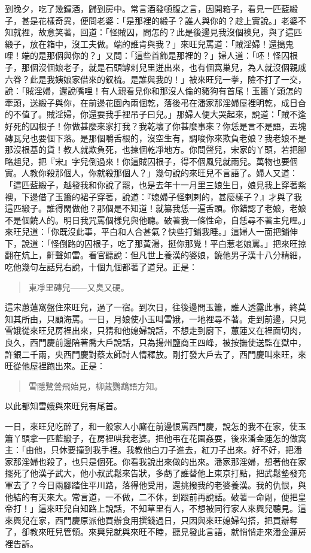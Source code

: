 到晚夕，吃了幾鐘酒，歸到房中。常言酒發頓腹之言，因開箱子，看見一匹藍緞子，甚是花樣奇異，便問老婆：「是那裡的緞子？誰人與你的？趁上實說。」老婆不知就裡，故意笑著，回道：「怪賊囚，問怎的？此是後邊見我沒個襖兒，與了這匹緞子，放在箱中，沒工夫做。端的誰肯與我？」來旺兒罵道：「賊淫婦！還搗鬼哩！端的是那個與你的？」又問：「這些首飾是那裡的？」婦人道：「呸！怪囚根子，那個沒個娘老子，就是石頭罅剌兒里迸出來，也有個窩巢兒，為人就沒個親戚六眷？此是我姨娘家借來的釵梳。是誰與我的！」被來旺兒一拳，險不打了一交，說：「賊淫婦，還說嘴哩！有人親看見你和那沒人倫的豬狗有首尾！玉簫丫頭怎的牽頭，送緞子與你，在前邊花園內兩個乾，落後弔在潘家那淫婦屋裡明乾，成日㒲的不值了。賊淫婦，你還要我手裡吊子曰兒。」那婦人便大哭起來，說道：「賊不逢好死的囚根子！你做甚麼來家打我？我乾壞了你甚麼事來？你恁是言不是語，丟塊磚瓦兒也要個下落。是那個嚼舌根的，沒空生有，調唆你來欺負老娘？我老娘不是那沒根基的貨！教人就欺負死，也揀個乾凈地方。你問聲兒，宋家的丫頭，若把腳略趄兒，把『宋』字兒倒過來！你這賊囚根子，得不個風兒就雨兒。萬物也要個實。人教你殺那個人，你就殺那個人？」幾句說的來旺兒不言語了。婦人又道：「這匹藍緞子，越發我和你說了罷，也是去年十一月里三娘生日，娘見我上穿著紫襖，下邊借了玉簫的裙子穿著，說道：『媳婦子怪剌剌的，甚麼樣子？』才與了我這匹緞子。誰得閑做他？那個是不知道！就纂我恁一遍舌頭。你錯認了老娘，老娘不是個饒人的。明日我咒罵個樣兒與他聽。破著我一條性命，自恁尋不著主兒哩。」來旺兒道：「你既沒此事，平白和人合甚氣？快些打鋪我睡。」這婦人一面把鋪伸下，說道：「怪倒路的囚根子，吃了那黃湯，挺你那覺！平白惹老娘罵。」把來旺掠翻在炕上，鼾聲如雷。看官聽說：但凡世上養漢的婆娘，饒他男子漢十八分精細，吃他幾句左話兒右說，十個九個都著了道兒。正是：
\begin{quote}
東凈里磚兒——又臭又硬。
\end{quote}

這宋蕙蓮窩盤住來旺兒，過了一宿。到次日，往後邊問玉簫，誰人透露此事，終莫知其所由，只顧海罵。一日，月娘使小玉叫雪娥，一地裡尋不著。走到前邊，只見雪娥從來旺兒房裡出來，只猜和他媳婦說話，不想走到廚下，蕙蓮又在裡面切肉，良久，西門慶前邊陪著喬大戶說話，只為揚州鹽商王四峰，被按撫使送監在獄中，許銀二千兩，央西門慶對蔡太師討人情釋放。剛打發大戶去了，西門慶叫來旺，來旺從他屋裡跑出來。正是：
\begin{quote}
雪隱鷺鶯飛始見，柳藏鸚鵡語方知。
\end{quote}

以此都知雪娥與來旺兒有尾首。

一日，來旺兒吃醉了，和一般家人小廝在前邊恨罵西門慶，說怎的我不在家，使玉簫丫頭拿一匹藍緞子，在房裡哄我老婆。把他弔在花園姦耍，後來潘金蓮怎的做窩主：「由他，只休要撞到我手裡。我教他白刀子進去，紅刀子出來。好不好，把潘家那淫婦也殺了，也只是個死。你看我說出來做的出來。潘家那淫婦，想著他在家擺死了他漢子武大，他小叔武鬆來告狀，多虧了誰替他上東京打點，把武鬆墊發充軍去了？今日兩腳踏住平川路，落得他受用，還挑撥我的老婆養漢。我的仇恨，與他結的有天來大。常言道，一不做，二不休，到跟前再說話。破著一命剮，便把皇帝打！」這來旺兒自知路上說話，不知草里有人，不想被同行家人來興兒聽見。這來興兒在家，西門慶原派他買辦食用撰錢過日，只因與來旺媳婦勾搭，把買辦奪了，卻教來旺兒管領。來興兒就與來旺不睦，聽見發此言語，就悄悄走來潘金蓮房裡告訴。

